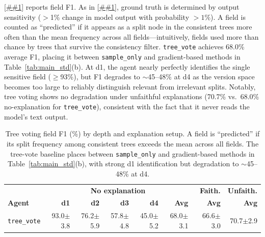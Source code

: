 \documentclass{article} %
\newcommand{\Cref}[1]{\ref{##1}}
\begin{document}
\Cref{tab:tree_voting_f1} reports field F1.
As in \Cref{app:field_f1}, ground truth is determined by output sensitivity ($>$1\% change in model output with probability ${>}1\%$).
A field is counted as ``predicted'' if it appears as a split node in the consistent trees more often than the mean frequency across all fields---intuitively, fields used more than chance by trees that survive the consistency filter.
\texttt{tree\_vote} achieves 68.0\% average F1, placing it between \texttt{sample\_only} and gradient-based methods in Table~\ref{tab:main_std}(b).
At d1, the agent nearly perfectly identifies the single sensitive field (${\geq}$93\%), but F1 degrades to ${\sim}$45--48\% at d4 as the version space becomes too large to reliably distinguish relevant from irrelevant splits.
Notably, tree voting shows no degradation under unfaithful explanations (70.7\% vs.\ 68.0\% no-explanation for \texttt{tree\_vote}), consistent with the fact that it never reads the model's text output.

\begin{table}[h]
\small
\begin{center}
\begin{tabular}{@{}l rrrr r | r | r@{}}
\toprule
 & \multicolumn{5}{c|}{\textbf{No explanation}} & \textbf{Faith.} & \textbf{Unfaith.} \\
\textbf{Agent} & \textbf{d1} & \textbf{d2} & \textbf{d3} & \textbf{d4} & \textbf{Avg} & \textbf{Avg} & \textbf{Avg} \\
\midrule
\texttt{tree\_vote} & 93.0{\scriptsize$\pm$3.8} & 76.2{\scriptsize$\pm$5.9} & 57.8{\scriptsize$\pm$4.8} & 45.0{\scriptsize$\pm$5.2} & 68.0{\scriptsize$\pm$3.1} & 66.6{\scriptsize$\pm$3.0} & 70.7{\scriptsize$\pm$2.9} \\
\bottomrule
\end{tabular}
\end{center}
\caption{Tree voting field F1 (\%) by depth and explanation setup. A field is ``predicted'' if its split frequency among consistent trees exceeds the mean across all fields. The tree-vote baseline places between \texttt{sample\_only} and gradient-based methods in Table~\ref{tab:main_std}(b), with strong d1 identification but degradation to ${\sim}$45--48\% at d4.}
\label{tab:tree_voting_f1}
\end{table}
\end{document}

